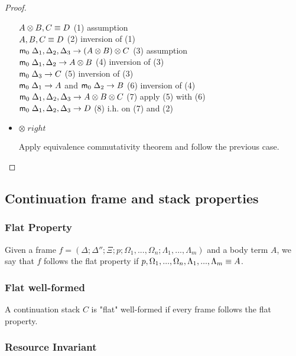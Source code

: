 \begin{proof}
\begin{itemize}
      $A \otimes B, C \equiv D$ \hfill (1) assumption \\
      $A, B, C \equiv D$ \hfill (2) inversion of (1) \\
      $\mathsf{m}_0 \; \Delta_1, \Delta_2, \Delta_3 \rightarrow (A \otimes B) \otimes C$ \hfill (3) assumption \\
      $\mathsf{m}_0 \; \Delta_1, \Delta_2 \rightarrow A \otimes B$ \hfill (4) inversion of (3) \\
      $\mathsf{m}_0 \; \Delta_3 \rightarrow C$ \hfill (5) inversion of (3) \\
      $\mathsf{m}_0 \; \Delta_1 \rightarrow A$ and $\mathsf{m}_0 \; \Delta_2 \rightarrow B$ \hfill (6) inversion of (4) \\
      $\mathsf{m}_0 \; \Delta_1, \Delta_2, \Delta_3 \rightarrow A \otimes B \otimes C$ \hfill (7) apply (5) with (6) \\
      $\mathsf{m}_0 \; \Delta_1, \Delta_2, \Delta_3 \rightarrow D$ \hfill (8) i.h. on (7) and (2)\\
      
      \item $\otimes \; right$
      
      Apply equivalence commutativity theorem and follow the previous case.
   \end{itemize}
\end{proof}

\subsection{Continuation frame and stack properties}

\subsubsection{Flat Property}

Given a frame $f = (\Delta; \Delta''; \Xi; p; \Omega_1, ..., \Omega_n; \Lambda_1, ..., \Lambda_m)$ and a body term $A$, we say that $f$ follows the flat property if $p, \Omega_1, ..., \Omega_n, \Lambda_1, ..., \Lambda_m \equiv A$.

\subsubsection{Flat well-formed}

A continuation stack $C$ is "flat" well-formed if every frame follows the flat property.

\subsubsection{Resource Invariant}

